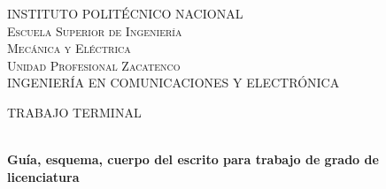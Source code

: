 \begin{center}
\pagestyle{empty} %
\vspace*{-1.5cm}								%
\textsc{\LARGE  INSTITUTO POLITÉCNICO NACIONAL}\\[1.5cm]	

\textsc{\LARGE Escuela Superior de Ingenier\'ia\\ Mecánica y Eléctrica\\ \vspace{8px} \Large Unidad Profesional Zacatenco}\\[.15cm]				

\vspace{8px} \small  INGENIERÍA EN COMUNICACIONES Y ELECTRÓNICA \\[1.5cm]				

\begin{minipage}{0.9\textwidth} 

\begin{center}																					%
\textsc{\huge TRABAJO TERMINAL } %

 

\end{center}

\end{minipage}\\[0.5cm]
 			\vspace*{1cm}																		%
{ \huge \bfseries Guía, esquema, cuerpo del escrito 
para trabajo de grado de licenciatura\\[0.03cm] } 



\end{center}
